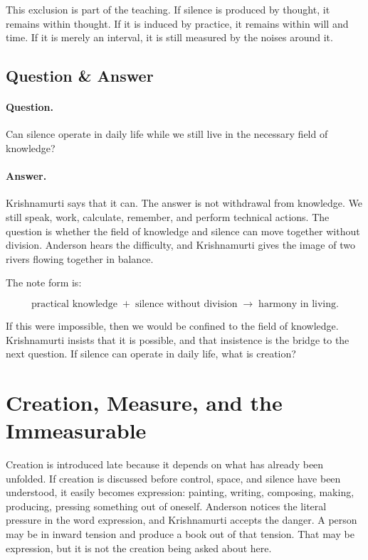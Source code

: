 This exclusion is part of the teaching. If silence is produced by thought, it remains within thought. If it is induced by practice, it remains within will and time. If it is merely an interval, it is still measured by the noises around it.

\subsection{Question \& Answer}

\paragraph{Question.}
Can silence operate in daily life while we still live in the necessary field of knowledge?

\paragraph{Answer.}
Krishnamurti says that it can. The answer is not withdrawal from knowledge. We still speak, work, calculate, remember, and perform technical actions. The question is whether the field of knowledge and silence can move together without division. Anderson hears the difficulty, and Krishnamurti gives the image of two rivers flowing together in balance.

The note form is:

\begin{equation}
\text{practical knowledge}
\;+\;
\text{silence without division}
\;\longrightarrow\;
\text{harmony in living}.
\end{equation}

If this were impossible, then we would be confined to the field of knowledge. Krishnamurti insists that it is possible, and that insistence is the bridge to the next question. If silence can operate in daily life, what is creation?

\section{Creation, Measure, and the Immeasurable}

Creation is introduced late because it depends on what has already been unfolded. If creation is discussed before control, space, and silence have been understood, it easily becomes expression: painting, writing, composing, making, producing, pressing something out of oneself. Anderson notices the literal pressure in the word expression, and Krishnamurti accepts the danger. A person may be in inward tension and produce a book out of that tension. That may be expression, but it is not the creation being asked about here.

